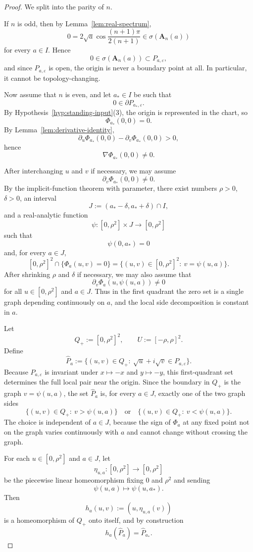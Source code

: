 \documentclass[11pt]{article}
\begin{document}
\begin{proof}
We split into the parity of \(n\).

If \(n\) is odd, then by Lemma~\ref{lem:real-spectrum},
\[
0=2\sqrt a\cos\frac{(n+1)\pi}{2(n+1)}\in \sigma(\mathbf A_n(a))
\]
for every \(a\in I\). Hence
\[
0\in \sigma(\mathbf A_n(a))\subset P_{a,\varepsilon},
\]
and since \(P_{a,\varepsilon}\) is open, the origin is never a boundary point at all. In particular, it cannot be topology-changing.

Now assume that \(n\) is even, and let \(a_*\in I\) be such that
\[
0\in \partial P_{a_*,\varepsilon}.
\]
By Hypothesis~\ref{hyp:standing-input}(3), the origin is represented in the chart, so
\[
\Phi_{a_*}(0,0)=0.
\]
By Lemma~\ref{lem:derivative-identity},
\[
\partial_u\Phi_{a_*}(0,0)-\partial_v\Phi_{a_*}(0,0)>0,
\]
hence
\[
\nabla \Phi_{a_*}(0,0)\neq 0.
\]

After interchanging \(u\) and \(v\) if necessary, we may assume
\[
\partial_v\Phi_{a_*}(0,0)\neq 0.
\]
By the implicit-function theorem with parameter, there exist numbers \(\rho>0\), \(\delta>0\), an interval
\[
J:=(a_*-\delta,a_*+\delta)\cap I,
\]
and a real-analytic function
\[
\psi:[0,\rho^2]\times J\to[0,\rho^2]
\]
such that
\[
\psi(0,a_*)=0
\]
and, for every \(a\in J\),
\[
[0,\rho^2]^2\cap \{\Phi_a(u,v)=0\}
=
\{(u,v)\in [0,\rho^2]^2:\ v=\psi(u,a)\}.
\]
After shrinking \(\rho\) and \(\delta\) if necessary, we may also assume that
\[
\partial_v\Phi_a(u,\psi(u,a))\neq 0
\]
for all \(u\in[0,\rho^2]\) and \(a\in J\). Thus in the first quadrant the zero set is a single graph depending continuously on \(a\), and the local side decomposition is constant in \(a\).

Let
\[
Q_+:=[0,\rho^2]^2,
\qquad
U:=[-\rho,\rho]^2.
\]
Define
\[
\widehat P_a
:=
\{(u,v)\in Q_+:\ \sqrt u+i\sqrt v\in P_{a,\varepsilon}\}.
\]
Because \(P_{a,\varepsilon}\) is invariant under \(x\mapsto -x\) and \(y\mapsto -y\), this first-quadrant set determines the full local pair near the origin. Since the boundary in \(Q_+\) is the graph \(v=\psi(u,a)\), the set \(\widehat P_a\) is, for every \(a\in J\), exactly one of the two graph sides
\[
\{(u,v)\in Q_+:\ v>\psi(u,a)\}
\quad\text{or}\quad
\{(u,v)\in Q_+:\ v<\psi(u,a)\}.
\]
The choice is independent of \(a\in J\), because the sign of \(\Phi_a\) at any fixed point not on the graph varies continuously with \(a\) and cannot change without crossing the graph.

For each \(u\in[0,\rho^2]\) and \(a\in J\), let
\[
\eta_{u,a}:[0,\rho^2]\to[0,\rho^2]
\]
be the piecewise linear homeomorphism fixing \(0\) and \(\rho^2\) and sending
\[
\psi(u,a)\mapsto \psi(u,a_*).
\]
Then
\[
h_a(u,v):=(u,\eta_{u,a}(v))
\]
is a homeomorphism of \(Q_+\) onto itself, and by construction
\[
h_a(\widehat P_a)=\widehat P_{a_*}.
\]


\end{proof}
\end{document}
